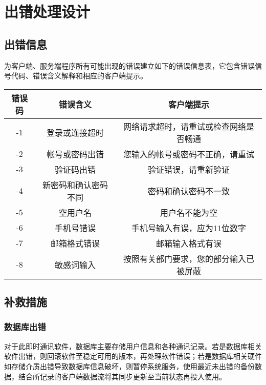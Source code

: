 \chapter{出错处理设计}
\section{出错信息}
为客户端、服务端程序所有可能出现的错误建立如下的错误信息表，它包含错误信号代码、错误含义解释和相应的客户端提示。

\begin{tabular}{|c|c|c|}
\hline

错误码&错误含义&客户端提示 \\

\hline

-1&登录或连接超时&网络请求超时，请重试或检查网络是否畅通 \\

\hline

-2&帐号或密码出错&您输入的帐号或密码不正确，请重试 \\

\hline

-3&验证码出错&验证错误，请重新验证 \\

\hline

-4&新密码和确认密码不同&密码和确认密码不一致 \\

\hline

-5&空用户名&用户名不能为空 \\

\hline

-6&手机号错误&手机号输入有误，应为11位数字 \\

\hline

-7&邮箱格式错误&邮箱输入格式有误 \\

\hline

-8&敏感词输入&按照有关部门要求，您的部分输入已被屏蔽 \\

\hline

\end{tabular}


\section{补救措施}
\subsection{数据库出错}
对于此即时通讯软件，数据库主要存储用户信息和各种通讯记录。若是数据库相关软件出错，则回滚软件至稳定可用的版本，再处理软件错误；若是数据库相关硬件如存储介质出错导致数据库信息破坏，则暂停系统服务，使用最近未出错的备份数据，结合所记录的客户端数据流将其同步更新至当前状态再投入使用。

